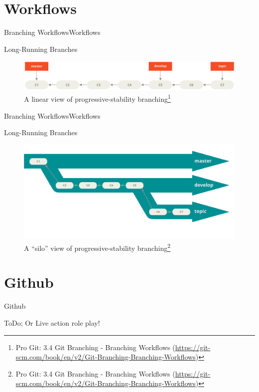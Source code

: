 \documentclass[aspectratio=169]{beamer}
\newcommand{\sectiontitle}{}
\newcommand{\newsection}[1]{\renewcommand{\sectiontitle}{#1}\section{#1}}
\begin{document}

\newsection{Workflows}
\begin{frame}{Branching Workflows}{\sectiontitle}
\begin{block}{Long-Running Branches}
\begin{figure}
    \centering
    \includegraphics[width=\textwidth,height=0.5\textheight,keepaspectratio]{lr-branches-1}
    \caption{
         A linear view of progressive-stability branching\footnote{
            Pro Git: 3.4 Git Branching - Branching Workflows
            (\url{https://git-scm.com/book/en/v2/Git-Branching-Branching-Workflows})
        }
    }
\end{figure}
\end{block}
\end{frame}

\begin{frame}{Branching Workflows}{\sectiontitle}
\begin{block}{Long-Running Branches}
\begin{figure}
    \centering
    \includegraphics[width=\textwidth,height=0.5\textheight,keepaspectratio]{lr-branches-2}
    \caption{
         A “silo” view of progressive-stability branching\footnote{
            Pro Git: 3.4 Git Branching - Branching Workflows
            (\url{https://git-scm.com/book/en/v2/Git-Branching-Branching-Workflows})
        }
    }
\end{figure}
\end{block}
\end{frame}



\newsection{Github}
\begin{frame}{\sectiontitle}
\begin{block}{ToDo; Or}
Live action role play!
\end{block}
\end{frame}
\end{document}
